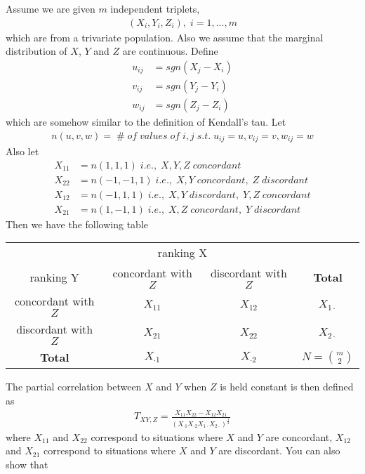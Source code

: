 \documentclass[twoside]{article}
\begin{document}
	Assume we are given $m$ independent triplets, 
	\begin{align*}
		(X_i, Y_i, Z_i), \; i = 1, ..., m
	\end{align*}
	which are from a trivariate population. Also we assume that the marginal distribution of $X$, $Y$ and $Z$ are continuous. Define
	\begin{align*}
		u_{ij} &= sgn \left( X_j - X_i \right) \\
		v_{ij} &= sgn \left( Y_j - Y_i \right) \\
		w_{ij} &= sgn \left( Z_j - Z_i \right)
	\end{align*}
	which are somehow similar to the definition of Kendall's tau. Let
	\begin{align*}
		n(u,v,w) = \; \# \; of \; values \; of \; i,j \; s.t. \; u_{ij} = u, v_{ij} = v, w_{ij} = w
	\end{align*}
	Also let
	\begin{align*}
		X_{11} &= n(1,1,1)\; i.e., \; X, Y, Z \; concordant \\
		X_{22} &= n(-1,-1,1)\; i.e., \; X,Y \; concordant, \; Z \; discordant \\
		X_{12} &= n(-1,1,1)\; i.e., \; X,Y \; discordant, \; Y,Z \; concordant \\
		X_{21} &= n(1,-1,1)\; i.e., \; X,Z \; concordant, \; Y \; discordant 
	\end{align*}
	Then we have the following table
	\begin{center}
		\begin{tabular}{c|c|c|c}
			\multicolumn{4}{c}{ranking X}\\
			ranking Y & concordant with $Z$ & discordant with $Z$ & \textbf{Total}\\
			\hline
			concordant with $Z$ & $X_{11}$ & $X_{12}$ & $X_{1 \cdot}$ \\
			\hline
			discordant with $Z$ & $X_{21}$ & $X_{22}$ & $X_{2 \cdot}$ \\
			\hline
			\textbf{Total} & $X_{\cdot 1}$ & $X_{\cdot 2}$ & $N = \binom{m}{2}$ 
		\end{tabular}
	\end{center}
	The partial correlation between $X$ and $Y$ when $Z$ is held constant is then defined as
	\begin{align*}
		T_{XY,Z} = \frac{X_{11} X_{22} - X_{12} X_{21}}{\left( X_{\cdot 1} X_{\cdot 2} X_{1 \cdot} X_{2 \cdot} \right)^{\frac{1}{2}}}
	\end{align*}
	where $X_{11}$ and $X_{22}$ correspond to situations where $X$ and $Y$ are concordant, $X_{12}$ and $X_{21}$ correspond to situations where $X$ and $Y$ are discordant. You can also show that 
\end{document}
